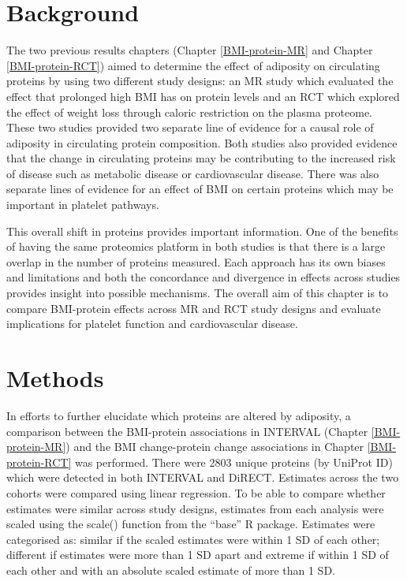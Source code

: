 \documentclass[11pt,twoside]{bristolthesis}
\begin{document}
\hypertarget{background-5}{%
\section{Background}\label{background-5}}

The two previous results chapters (Chapter \ref{BMI-protein-MR} and Chapter \ref{BMI-protein-RCT}) aimed to determine the effect of adiposity on circulating proteins by using two different study designs: an MR study which evaluated the effect that prolonged high BMI has on protein levels and an RCT which explored the effect of weight loss through caloric restriction on the plasma proteome. These two studies provided two separate line of evidence for a causal role of adiposity in circulating protein composition. Both studies also provided evidence that the change in circulating proteins may be contributing to the increased risk of disease such as metabolic disease or cardiovascular disease. There was also separate lines of evidence for an effect of BMI on certain proteins which may be important in platelet pathways.

This overall shift in proteins provides important information. One of the benefits of having the same proteomics platform in both studies is that there is a large overlap in the number of proteins measured. Each approach has its own biases and limitations and both the concordance and divergence in effects across studies provides insight into possible mechanisms. The overall aim of this chapter is to compare BMI-protein effects across MR and RCT study designs and evaluate implications for platelet function and cardiovascular disease.

\hypertarget{methods-4}{%
\section{Methods}\label{methods-4}}

In efforts to further elucidate which proteins are altered by adiposity, a comparison between the BMI-protein associations in INTERVAL (Chapter \ref{BMI-protein-MR}) and the BMI change-protein change associations in Chapter \ref{BMI-protein-RCT} was performed. There were 2803 unique proteins (by UniProt ID) which were detected in both INTERVAL and DiRECT. Estimates across the two cohorts were compared using linear regression. To be able to compare whether estimates were similar across study designs, estimates from each analysis were scaled using the scale() function from the ``base'' R package. Estimates were categorised as: similar if the scaled estimates were within 1 SD of each other; different if estimates were more than 1 SD apart and extreme if within 1 SD of each other and with an absolute scaled estimate of more than 1 SD.
\end{document}
